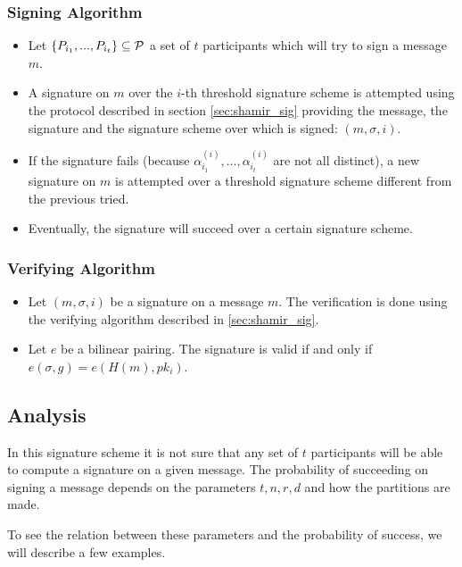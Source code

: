 \subsubsection*{Signing Algorithm}
\begin{itemize}[align = left, leftmargin=*, label={--}]
\item Let $\{P_{i_1}, ..., P_{i_t} \} \subseteq {\mathcal P}$ a set of $t$ participants which will try to sign a message $m$.

\item A signature on $m$ over the $i$-th threshold signature scheme is attempted using the protocol described in section \ref{sec:shamir_sig} providing the message, the signature and the signature scheme over which is signed: $(m,\sigma, i)$.

\item If the signature fails (because $\alpha^{(i)}_{i_1}, ... , \alpha^{(i)}_{i_t}$ are not all distinct), a new signature on $m$ is attempted over a threshold signature scheme different from the previous tried.

\item Eventually, the signature will succeed over a certain signature scheme.
\end{itemize}

\subsubsection*{Verifying Algorithm}
\begin{itemize}[align = left, leftmargin=*, label={--}]
\item Let $(m, \sigma, i)$ be a signature on a message $m$. The verification is done using the verifying algorithm described in \ref{sec:shamir_sig}.
\item Let $e$ be a bilinear pairing. The signature is valid if and only if $e(\sigma,g) = e(H(m),pk_i)$.
\end{itemize}

\subsection{Analysis}
In this signature scheme it is not sure that any set of $t$ participants will be able to compute a signature on a given message. The probability of succeeding on signing a message depends on the parameters $t,n,r,d$ and how the partitions are made.

To see the relation between these parameters and the probability of success, we will describe a few examples.

